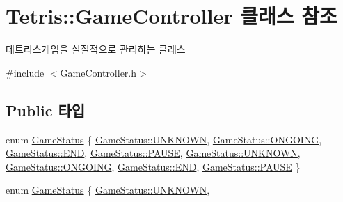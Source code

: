 \hypertarget{class_tetris_1_1_game_controller}{}\section{Tetris\+:\+:Game\+Controller 클래스 참조}
\label{class_tetris_1_1_game_controller}


테트리스게임을 실질적으로 관리하는 클래스  




{\ttfamily \#include $<$Game\+Controller.\+h$>$}

\subsection*{Public 타입}
\begin{DoxyCompactItemize}
\item 
enum \hyperlink{class_tetris_1_1_game_controller_a96a963b56385f3b3a122ff0ca2beb770}{Game\+Status} \{ \newline
\hyperlink{class_tetris_1_1_game_controller_a96a963b56385f3b3a122ff0ca2beb770a696b031073e74bf2cb98e5ef201d4aa3}{Game\+Status\+::\+U\+N\+K\+N\+O\+WN}, 
\hyperlink{class_tetris_1_1_game_controller_a96a963b56385f3b3a122ff0ca2beb770acff9d04a8a29792d319be9177afb8ba3}{Game\+Status\+::\+O\+N\+G\+O\+I\+NG}, 
\hyperlink{class_tetris_1_1_game_controller_a96a963b56385f3b3a122ff0ca2beb770ab1a326c06d88bf042f73d70f50197905}{Game\+Status\+::\+E\+ND}, 
\hyperlink{class_tetris_1_1_game_controller_a96a963b56385f3b3a122ff0ca2beb770a291554596c183e837f0a6bec3767c891}{Game\+Status\+::\+P\+A\+U\+SE}, 
\newline
\hyperlink{class_tetris_1_1_game_controller_a96a963b56385f3b3a122ff0ca2beb770a696b031073e74bf2cb98e5ef201d4aa3}{Game\+Status\+::\+U\+N\+K\+N\+O\+WN}, 
\hyperlink{class_tetris_1_1_game_controller_a96a963b56385f3b3a122ff0ca2beb770acff9d04a8a29792d319be9177afb8ba3}{Game\+Status\+::\+O\+N\+G\+O\+I\+NG}, 
\hyperlink{class_tetris_1_1_game_controller_a96a963b56385f3b3a122ff0ca2beb770ab1a326c06d88bf042f73d70f50197905}{Game\+Status\+::\+E\+ND}, 
\hyperlink{class_tetris_1_1_game_controller_a96a963b56385f3b3a122ff0ca2beb770a291554596c183e837f0a6bec3767c891}{Game\+Status\+::\+P\+A\+U\+SE}
 \}
\item 
enum \hyperlink{class_tetris_1_1_game_controller_a96a963b56385f3b3a122ff0ca2beb770}{Game\+Status} \{ \newline
\hyperlink{class_tetris_1_1_game_controller_a96a963b56385f3b3a122ff0ca2beb770a696b031073e74bf2cb98e5ef201d4aa3}{Game\+Status\+::\+U\+N\+K\+N\+O\+WN}, 

\end{DoxyCompactItemize}
